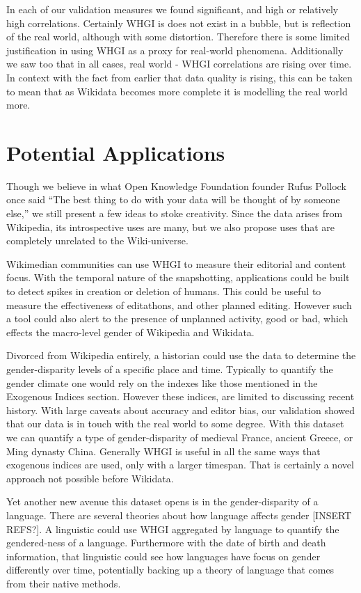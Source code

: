 \documentclass[letterpaper]{article}
\begin{document}
In each of our validation measures we found significant, and high or relatively high correlations. Certainly WHGI is does not exist in a bubble, but is reflection of the real world, although with some distortion. Therefore there is some limited justification in using WHGI as a proxy for real-world phenomena. Additionally we saw too that in all cases, real world - WHGI correlations are rising over time. In context with the fact from earlier that data quality is rising, this can be taken to mean that as Wikidata becomes more complete it is modelling the real world more.

\section{Potential Applications}
Though we believe in what Open Knowledge Foundation founder Rufus Pollock once said ``The best thing to do with your data will be thought of by someone else,'' we still present a few ideas to stoke creativity. Since the data arises from Wikipedia, its introspective uses are many, but we also propose uses that are completely unrelated to the Wiki-universe. 

Wikimedian communities can use WHGI to measure their editorial and content focus. With the temporal nature of the snapshotting, applications could be built to detect spikes in creation or deletion of humans. This could be useful to measure the effectiveness of editathons, and other planned editing. However such a tool could also alert to the presence of unplanned activity, good or bad, which effects the macro-level gender of Wikipedia and Wikidata.

Divorced from Wikipedia entirely, a historian could use the data to determine the gender-disparity levels of a specific place and time. Typically to quantify the gender climate one would rely on the indexes like those mentioned in the Exogenous Indices section. However these indices, are limited to discussing recent history. With large caveats about accuracy and editor bias, our validation showed that our data is in touch with the real world to some degree. With this dataset we can quantify a type of gender-disparity of medieval France, ancient Greece, or Ming dynasty China. Generally WHGI is useful in all the same ways that exogenous indices are used, only with a larger timespan. That is certainly a novel approach not possible before Wikidata.

Yet another new avenue this dataset opens is in the gender-disparity of a language. There are several theories about how language affects gender [INSERT REFS?]. A linguistic could use WHGI aggregated by language to quantify the gendered-ness of a language. Furthermore with the date of birth and death information, that linguistic could see how languages have focus on gender differently over time, potentially backing up a theory of language that comes from their native methods. 
\end{document}

